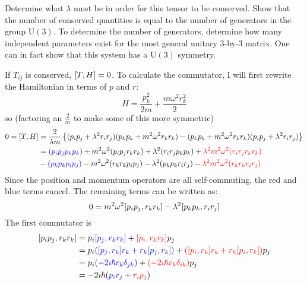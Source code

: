 \documentclass[a4paper,twoside]{article}
\begin{document}
Determine what $ \lambda $ must be in order for this tensor to be conserved. Show that the number of conserved quantities is equal to the number of generators in the group $ \text{U}(3) $. To determine the number of generators, determine how many independent parameters exist for the most general unitary $ 3 $-by-$ 3 $ matrix. One can in fact show that this system has a $ \text{U}(3) $ symmetry.
\begin{problem}
    If $ T_{ij} $ is conserved, $ \comm{T}{H} = 0 $. To calculate the commutator, I will first rewrite the Hamiltonian in terms of $ p $ and $ r $:
    \begin{equation}
        H = \frac{p_k^2}{2m} + \frac{m \omega^2 r_k^2}{2}
    \end{equation}
    so (factoring an $ \frac{2}{m} $ to make some of this more symmetric)
    \begin{align}
        0 = \comm{T}{H} &= \frac{2}{\lambda m}\left\{ (p_i p_j + \lambda^2 r_i r_j)(p_k p_k + m^2 \omega^2 r_k r_k) - (p_k p_k + m^2 \omega^2 r_k r_k)(p_i p_j + \lambda^2 r_i r_j)\right\} \\
        &= \color{blue}(p_i p_j p_k p_k) \color{black}+ m^2 \omega^2 (p_i p_j r_k r_k) + \lambda^2 (r_i r_j p_k p_k) + \color{red}\lambda^2 m^2 \omega^2 (r_i r_j r_k r_k)\color{black} \\
        &- \color{blue}(p_k p_k p_i p_j)\color{black} - m^2 \omega^2 (r_k r_k p_i p_j) - \lambda^2 (p_k p_k r_i r_j) - \color{red}\lambda^2 m^2 \omega^2 (r_k r_k r_i r_j)\color{black}
    \end{align}
    Since the position and momentum operators are all self-commuting, the red and blue terms cancel. The remaining terms can be written as:
    \begin{equation}
        0 = m^2 \omega^2 \comm{p_i p_j}{r_k r_k} - \lambda^2 \comm{p_k p_k}{r_i r_j}
    \end{equation}
    The first commutator is
    \begin{align}
        \comm{p_i p_j}{r_k r_k} &= p_i \color{blue}\comm{p_j}{r_k r_k}\color{black} + \color{red}\comm{p_i}{r_k r_k}\color{black} p_j \\
        &= p_i\color{blue}(\comm{p_j}{r_k} r_k + r_k \comm{p_j}{r_k})\color{black} + \color{red}(\comm{p_i}{r_k} r_k + r_k \comm{p_i}{r_k})\color{black} p_j \\
        &= p_i\color{blue}(-2 \imath \hbar r_k \delta_{jk})\color{black} + \color{red}(-2 \imath \hbar r_k \delta_{ik})\color{black} p_j \\
        &= - 2 \imath \hbar (\color{blue}p_i r_j\color{black} + \color{red}r_i p_j\color{black}) \\

\end{align}
\end{problem}
\end{document}
